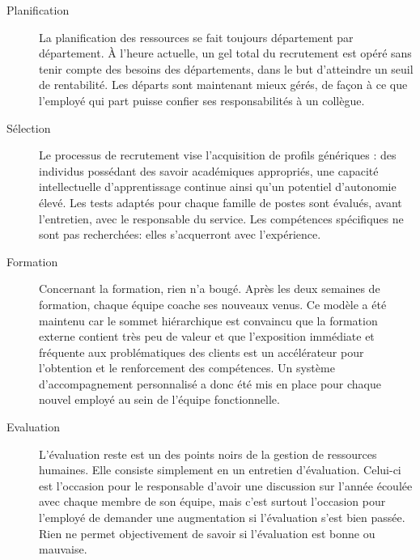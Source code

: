 \begin{description}
  \item[Planification] La planification des ressources se fait toujours département par département. À l'heure actuelle, un gel total du recrutement est opéré sans tenir compte des besoins des départements, dans le but d'atteindre un seuil de rentabilité. Les départs sont maintenant mieux gérés, de façon à ce que l'employé qui part puisse confier ses responsabilités à un collègue.
  \item[Sélection] Le processus de recrutement vise l’acquisition de profils génériques : des individus possédant des savoir académiques appropriés, une capacité intellectuelle d’apprentissage continue ainsi qu'un potentiel d’autonomie élevé. Les tests adaptés pour chaque famille de postes sont évalués, avant l'entretien, avec le responsable du service. Les compétences spécifiques ne sont pas recherchées: elles s'acquerront avec l'expérience. 
  
  \item[Formation] Concernant la formation, rien n'a bougé. Après les deux semaines de formation, chaque équipe coache ses nouveaux venus. Ce modèle a été maintenu car le sommet hiérarchique est convaincu que la formation externe contient très peu de valeur et que l’exposition immédiate et fréquente aux problématiques des clients est un accélérateur pour l’obtention et le renforcement des compétences. Un système d’accompagnement personnalisé a donc été mis en place pour chaque nouvel employé au sein de l'équipe fonctionnelle. 
  \item[Evaluation] L'évaluation reste est un des points noirs de la gestion de ressources humaines. Elle consiste simplement en un entretien d'évaluation. Celui-ci est l'occasion pour le responsable d'avoir une discussion sur l'année écoulée avec chaque membre de son équipe, mais c'est surtout l'occasion pour l'employé de demander une augmentation si l'évaluation s'est bien passée. Rien ne permet objectivement de savoir si l'évaluation est bonne ou mauvaise. 
  

\end{description}
